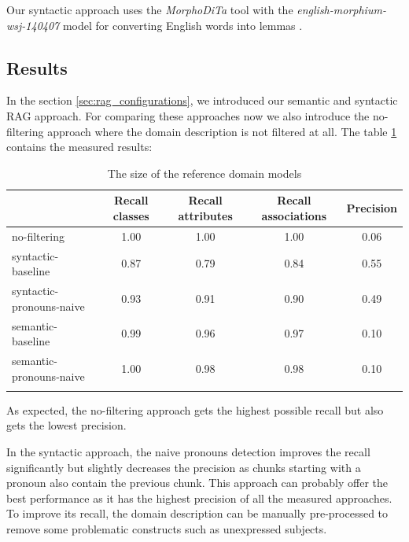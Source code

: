 Our syntactic approach uses the \textit{MorphoDiTa} tool \cite{Strakova2014} with the \textit{english-morphium-wsj-140407} model for converting English words into lemmas \cite{Straka2014}.


\subsection{Results}

In the section \ref{sec:rag_configurations}, we introduced our semantic and syntactic RAG approach. For comparing these approaches now we also introduce the no-filtering approach where the domain description is not filtered at all. The table \ref{tab:filtering-results} contains the measured results:

\begin{table}[!h]
    \scriptsize
    \centering
    \setlength{\tabcolsep}{0.5em}
    \begin{tabular}{lcccc}

    \toprule
         & Recall classes & Recall attributes & Recall associations & Precision \\
    \toprule
    
    \addlinespace
         no-filtering      & 1.00  & 1.00  & 1.00 & 0.06 \\
    	 syntactic-baseline & 0.87 & 0.79 & 0.84 & 0.55 \\
         syntactic-pronouns-naive & 0.93  & 0.91  & 0.90 & 0.49 \\
         semantic-baseline & 0.99 & 0.96 & 0.97 & 0.10 \\
         semantic-pronouns-naive & 1.00 & 0.98 & 0.98 & 0.10 \\
    \addlinespace
    \bottomrule
    \addlinespace
    \end{tabular}
    \caption{The size of the reference domain models}
    \label{tab:filtering-results}
\end{table}

As expected, the no-filtering approach gets the highest possible recall but also gets the lowest precision.

In the syntactic approach, the naive pronouns detection improves the recall significantly but slightly decreases the precision as chunks starting with a pronoun also contain the previous chunk. This approach can probably offer the best performance as it has the highest precision of all the measured approaches. To improve its recall, the domain description can be manually pre-processed to remove some problematic constructs such as unexpressed subjects.

